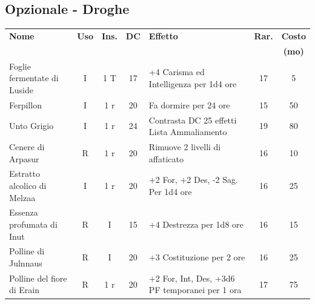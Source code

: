 \subsection{Opzionale - Droghe}\hypertarget{droghe}{}\label{droghe} 

\medskip

\noindent\begin{tabularx}{\linewidth}{lcccXcc}
	\toprule
\rowcolor{gray!20}\textbf{Nome}& \textbf{Uso} & \textbf{Ins.} & \textbf{DC} & \textbf{Effetto}& \textbf{Rar.} & \textbf{Costo} \\
\rowcolor{gray!20}&&&&&&\textbf{(mo)}\\
\toprule
Foglie fermentate di Luside\index{Foglie fermentate di Luside}& I& 1 T& 17&+4 Carisma ed Intelligenza per 1d4 ore& 17 & 5\\
\rowcolor{gray!20}Ferpillon \index{Ferpillon}& I& 1 r & 20& Fa dormire per 24 ore& 15 & 50 \\
Unto Grigio \index{Unto Grigio} & I& 1 r & 24& Contrasta DC 25 effetti Lista Ammaliamento& 19 & 80\\
\rowcolor{gray!20}Cenere di Arpasur \index{Cenere di Arpasur}& R& 1 r & 20& Rimuove 2 livelli di affaticato& 16 & 10\\
%
Estratto alcolico di Melzaa\index{Estratto alcolico di Melzaa}& I& 1 r & 20& +2 For, +2 Des, -2 Sag. Per 1d4 ore & 16 & 25 \\
\rowcolor{gray!20}Essenza profumata di Inut\index{Essenza profumata di Inut} & R& I& 15& +4 Destrezza per 1d8 ore& 16 & 15 \\
Polline di Julnnaus\index{Polline di Julnnaus} & R& I& 20& +3 Costituzione per 2 ore & 16 & 25\\
\rowcolor{gray!20}Polline del fiore di Erain \index{Polline del fiore di Erain} & R& 1 r& 20& +2 For, Int, Des, +3d6 PF temporanei per 1 ora& 17 & 75\\
\end{tabularx}

